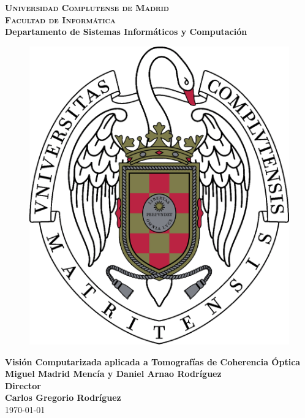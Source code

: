 
\begin{titlepage}
\begin{center}

  \textbf{\textsc{\LARGE Universidad Complutense de Madrid}}\\[1cm]
  \textbf{\textsc{\Large Facultad de Informática}}\\
  \textbf{Departamento de Sistemas Informáticos y Computación}
  \vspace{1.5cm}
  \begin{figure}[H]
    \centering
    \includegraphics[scale=0.17]{imagenes/logos/logo-ucm.pdf}
  \end{figure}
  \vspace{1.5cm}
  \textbf{\LARGE Visión Computarizada aplicada a Tomografías de Coherencia Óptica}\\[1cm]
  \textbf{\large Miguel Madrid Mencía y Daniel Arnao Rodríguez}\\[1cm]
  \textbf{Director}\\
  \textbf{\large Carlos Gregorio Rodríguez}\\
  \vfill \today
\end{center}
\end{titlepage}
